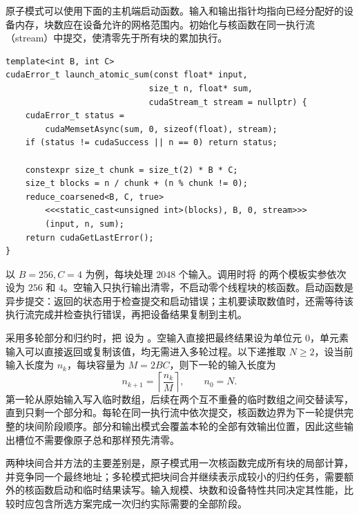 原子模式可以使用下面的主机端启动函数。输入和输出指针均指向已经分配好的设备内存，块数应在设备允许的网格范围内。初始化与核函数在同一执行流（stream）中提交，使清零先于所有块的累加执行。

\noindent\begin{minipage}{\linewidth}
\begin{lstlisting}[caption={在同一执行流中初始化输出并启动归约},label={l15:lst:code5}]
template<int B, int C>
cudaError_t launch_atomic_sum(const float* input,
                             size_t n, float* sum,
                             cudaStream_t stream = nullptr) {
    cudaError_t status =
        cudaMemsetAsync(sum, 0, sizeof(float), stream);
    if (status != cudaSuccess || n == 0) return status;

    constexpr size_t chunk = size_t(2) * B * C;
    size_t blocks = n / chunk + (n % chunk != 0);
    reduce_coarsened<B, C, true>
        <<<static_cast<unsigned int>(blocks), B, 0, stream>>>
        (input, n, sum);
    return cudaGetLastError();
}
\end{lstlisting}
\end{minipage}

以 $B=256,C=4$ 为例，每块处理 $2048$ 个输入。调用时将 \mbox{} 的两个模板实参依次设为 $256$ 和 $4$。空输入只执行输出清零，不启动零个线程块的核函数。启动函数是异步提交：返回的状态用于检查提交和启动错误；主机要读取数值时，还需等待该执行流完成并检查执行错误，再把设备结果复制到主机。

采用多轮部分和归约时，把 \mbox{} 设为 \mbox{}。空输入直接把最终结果设为单位元 $0$，单元素输入可以直接返回或复制该值，均无需进入多轮过程。以下递推取 $N\geq2$，设当前输入长度为 $n_k$，每块容量为 $M=2BC$，则下一轮的输入长度为
\begin{equation}
n_{k+1}=\left\lceil\frac{n_k}{M}\right\rceil,
\qquad n_0=N.
\label{l15:eq:multipass}
\end{equation}
第一轮从原始输入写入临时数组，后续在两个互不重叠的临时数组之间交替读写，直到只剩一个部分和。每轮在同一执行流中依次提交，核函数边界为下一轮提供完整的块间阶段顺序。部分和输出模式会覆盖本轮的全部有效输出位置，因此这些输出槽位不需要像原子总和那样预先清零。

两种块间合并方法的主要差别是，原子模式用一次核函数完成所有块的局部计算，并竞争同一个最终地址；多轮模式把块间合并继续表示成较小的归约任务，需要额外的核函数启动和临时结果读写。输入规模、块数和设备特性共同决定其性能，比较时应包含所选方案完成一次归约实际需要的全部阶段。
